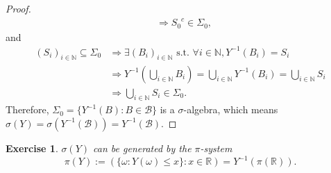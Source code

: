 \documentclass[a4paper, linespread=1.5]{article}
\newtheorem{exercise}[theorem]{Exercise}
\newcommand{\Natural}{\mathbb{N}}
\newcommand{\Real}{\mathbb{R}}
\newcommand{\BorelSet}{\mathcal{B}}
\begin{document}
\begin{proof}
\begin{align*}
            &\Rightarrow {S_0}^c \in \Sigma_0,
        \end{align*}
        and
        \begin{align*}
            (S_i)_{i \in \Natural} \subseteq \Sigma_0 &\Rightarrow \exists (B_i)_{i \in \Natural} \textrm{ s.t. } \forall i \in \Natural, Y^{-1}(B_i) = S_i \\
            &\Rightarrow Y^{-1}(\bigcup_{i \in \Natural} B_i) = \bigcup_{i \in \Natural} Y^{-1}(B_i) = \bigcup_{i \in \Natural} S_i \\
            &\Rightarrow \bigcup_{i \in \Natural} S_i \in \Sigma_0.
        \end{align*}
        Therefore, $\Sigma_0 = \{Y^{-1}(B) \colon B \in \BorelSet\}$ is a $\sigma$-algebra, which means $\sigma(Y) = \sigma(Y^{-1}(\BorelSet)) = Y^{-1}(\BorelSet)$.
    \end{proof}

    \begin{exercise}
        $\sigma(Y)$ can be generated by the $\pi$-system
        $$
        \pi(Y) := (\{\omega \colon Y(\omega) \leqslant x\} \colon x \in \Real) = Y^{-1}(\pi(\Real)).
        $$
    \end{exercise}
\end{document}

